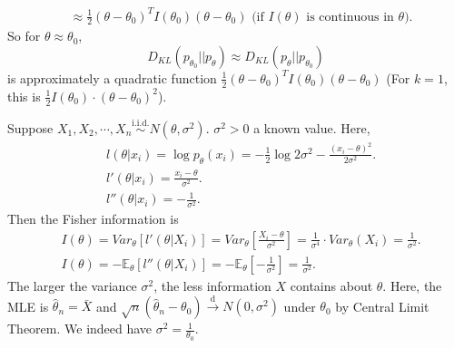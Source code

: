 \documentclass[a4paper]{article}
\begin{document}
\begin{enumerate}
\begin{equation}
\begin{aligned}
			&\approx \frac{1}{2}(\theta - \theta_0)^T I(\theta_0)(\theta-\theta_0) \text{ (if $I(\theta)$ is continuous in $\theta$)}.
		\end{aligned}
	\end{equation}
	So for $\theta \approx \theta_0$,
	\begin{equation}
		D_{KL}(p_{\theta_0}||p_{\theta}) \approx D_{KL}(p_{\theta}||p_{\theta_0})
	\end{equation}
	is approximately a quadratic function $\frac{1}{2}(\theta - \theta_0)^T I(\theta_0)(\theta-\theta_0)$ (For $k=1$, this is $\frac{1}{2}I(\theta_0) \cdot (\theta - \theta_0)^2$).
\end{enumerate}

\begin{eg}
	Suppose $X_1,X_2,\cdots,X_n \stackrel{\text{i.i.d.}}{\sim} N(\theta,\sigma^2)$. $\sigma^2 > 0$ a known value. Here,
	\begin{equation*}
		\begin{aligned}
			& l(\theta|x_i) = \log p_{\theta}(x_i) = -\frac{1}{2} \log 2\sigma^2 - \frac{(x_i-\theta)^2}{2\sigma^2}. \\
			& l'(\theta|x_i) = \frac{x_i-\theta}{\sigma^2}. \\
			& l''(\theta|x_i) = -\frac{1}{\sigma^2}.
		\end{aligned}
	\end{equation*}
	Then the Fisher information is
	\begin{equation*}
		\begin{aligned}
			& I(\theta) = Var_{\theta}[l'(\theta|X_i)] = Var_{\theta}\left[\frac{X_i-\theta}{\sigma^2}\right] = \frac{1}{\sigma^4} \cdot Var_{\theta}(X_i) = \frac{1}{\sigma^2}. \\
			& I(\theta) = -\mathbb{E}_{\theta}[l''(\theta|X_i)] = -\mathbb{E}_{\theta}\left[-\frac{1}{\sigma^2}\right] = \frac{1}{\sigma^2}.
		\end{aligned}
	\end{equation*}
	The larger the variance $\sigma^2$, the less information $X$ contains about $\theta$. Here, the MLE is $\hat{\theta}_n = \bar{X}$ and $\sqrt{n}(\hat{\theta}_n - \theta_0) \stackrel{\text{d}}{\longrightarrow} N(0,\sigma^2)$ under $\theta_0$ by Central Limit Theorem. We indeed have $\sigma^2 = \frac{1}{\theta_0}$.
\end{eg}
\end{document}
